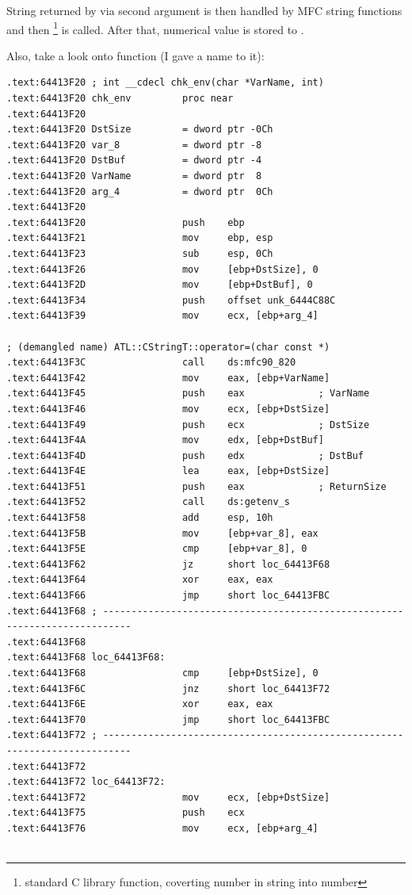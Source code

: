 {String returned by  via second argument is then handled by MFC string functions and then 
\footnote{standard C library function, coverting number in string into number} is called. 
After that, numerical value is stored to }.

{Also, take a look onto  function (I gave a name to it)}:

\begin{lstlisting}
.text:64413F20 ; int __cdecl chk_env(char *VarName, int)
.text:64413F20 chk_env         proc near
.text:64413F20
.text:64413F20 DstSize         = dword ptr -0Ch
.text:64413F20 var_8           = dword ptr -8
.text:64413F20 DstBuf          = dword ptr -4
.text:64413F20 VarName         = dword ptr  8
.text:64413F20 arg_4           = dword ptr  0Ch
.text:64413F20
.text:64413F20                 push    ebp
.text:64413F21                 mov     ebp, esp
.text:64413F23                 sub     esp, 0Ch
.text:64413F26                 mov     [ebp+DstSize], 0
.text:64413F2D                 mov     [ebp+DstBuf], 0
.text:64413F34                 push    offset unk_6444C88C
.text:64413F39                 mov     ecx, [ebp+arg_4]

; (demangled name) ATL::CStringT::operator=(char const *)
.text:64413F3C                 call    ds:mfc90_820 
.text:64413F42                 mov     eax, [ebp+VarName]
.text:64413F45                 push    eax             ; VarName
.text:64413F46                 mov     ecx, [ebp+DstSize]
.text:64413F49                 push    ecx             ; DstSize
.text:64413F4A                 mov     edx, [ebp+DstBuf]
.text:64413F4D                 push    edx             ; DstBuf
.text:64413F4E                 lea     eax, [ebp+DstSize]
.text:64413F51                 push    eax             ; ReturnSize
.text:64413F52                 call    ds:getenv_s
.text:64413F58                 add     esp, 10h
.text:64413F5B                 mov     [ebp+var_8], eax
.text:64413F5E                 cmp     [ebp+var_8], 0
.text:64413F62                 jz      short loc_64413F68
.text:64413F64                 xor     eax, eax
.text:64413F66                 jmp     short loc_64413FBC
.text:64413F68 ; ---------------------------------------------------------------------------
.text:64413F68
.text:64413F68 loc_64413F68:
.text:64413F68                 cmp     [ebp+DstSize], 0
.text:64413F6C                 jnz     short loc_64413F72
.text:64413F6E                 xor     eax, eax
.text:64413F70                 jmp     short loc_64413FBC
.text:64413F72 ; ---------------------------------------------------------------------------
.text:64413F72
.text:64413F72 loc_64413F72:
.text:64413F72                 mov     ecx, [ebp+DstSize]
.text:64413F75                 push    ecx
.text:64413F76                 mov     ecx, [ebp+arg_4]


\end{lstlisting}

